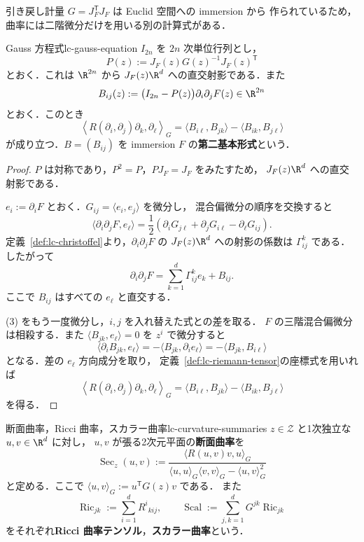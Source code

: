 引き戻し計量 $G=J_F^{\mathsf T}J_F$ は Euclid 空間への immersion から
作られているため，曲率には二階微分だけを用いる別の計算式がある．

\begin{theorem}{Gauss 方程式}{lc-gauss-equation}
  $I_{2n}$ を $2n$ 次単位行列とし，
  \[
    P(z):=J_F(z)G(z)^{-1}J_F(z)^{\mathsf T}
  \]
  とおく．これは $\R^{2n}$ から
  $J_F(z)\R^d$ への直交射影である．また
  \[
    B_{ij}(z)
    :=\bigl(I_{2n}-P(z)\bigr)\partial_i\partial_jF(z)
    \in\R^{2n}
  \]
  とおく．このとき
  \[
    \boxed{
      \left\langle
        R(\partial_i,\partial_j)\partial_k,\partial_\ell
      \right\rangle_G
      =\langle B_{i\ell},B_{jk}\rangle
       -\langle B_{ik},B_{j\ell}\rangle
    }
  \]
  が成り立つ．$B=(B_{ij})$ を immersion $F$ の\textbf{第二基本形式}という．
\end{theorem}

\begin{proof}
  $P$ は対称であり，$P^2=P$，$PJ_F=J_F$ をみたすため，
  $J_F(z)\R^d$ への直交射影である．

  $e_i:=\partial_iF$ とおく．$G_{ij}=\langle e_i,e_j\rangle$ を微分し，
  混合偏微分の順序を交換すると
  \[
    \langle\partial_i\partial_jF,e_\ell\rangle
    =\frac12\left(
      \partial_iG_{j\ell}+\partial_jG_{i\ell}-\partial_\ell G_{ij}
    \right).
  \]
  定義~\ref{def:lc-christoffel}より，$\partial_i\partial_jF$ の
  $J_F(z)\R^d$ への射影の係数は $\Gamma^k_{ij}$ である．したがって
  \[
    \partial_i\partial_jF
    =\sum_{k=1}^d\Gamma^k_{ij}e_k+B_{ij}.             \tag{3}
  \]
  ここで $B_{ij}$ はすべての $e_\ell$ と直交する．

  (3) をもう一度微分し，$i,j$ を入れ替えた式との差を取る．
  $F$ の三階混合偏微分は相殺する．また
  $\langle B_{jk},e_\ell\rangle=0$ を $z^i$ で微分すると
  \[
    \langle\partial_iB_{jk},e_\ell\rangle
    =-\langle B_{jk},\partial_i e_\ell\rangle
    =-\langle B_{jk},B_{i\ell}\rangle
  \]
  となる．差の $e_\ell$ 方向成分を取り，
  定義~\ref{def:lc-riemann-tensor}の座標式を用いれば
  \[
    \left\langle
      R(\partial_i,\partial_j)\partial_k,\partial_\ell
    \right\rangle_G
    =\langle B_{i\ell},B_{jk}\rangle
     -\langle B_{ik},B_{j\ell}\rangle
  \]
  を得る．
\end{proof}

\begin{definition}{断面曲率，Ricci 曲率，スカラー曲率}{lc-curvature-summaries}
  $z\in\mathcal{Z}$ と1次独立な $u,v\in\R^d$ に対し，
  $u,v$ が張る2次元平面の\textbf{断面曲率}を
  \[
    \operatorname{Sec}_z(u,v)
    :=\frac{
      \langle R(u,v)v,u\rangle_G
    }{
      \langle u,u\rangle_G\langle v,v\rangle_G
      -\langle u,v\rangle_G^2
    }
  \]
  と定める．ここで $\langle u,v\rangle_G:=u^{\mathsf T}G(z)v$ である．
  また
  \[
    \operatorname{Ric}_{jk}
    :=\sum_{i=1}^dR^i{}_{kij},
    \qquad
    \operatorname{Scal}
    :=\sum_{j,k=1}^dG^{jk}\operatorname{Ric}_{jk}
  \]
  をそれぞれ\textbf{Ricci 曲率テンソル}，\textbf{スカラー曲率}という．
\end{definition}

